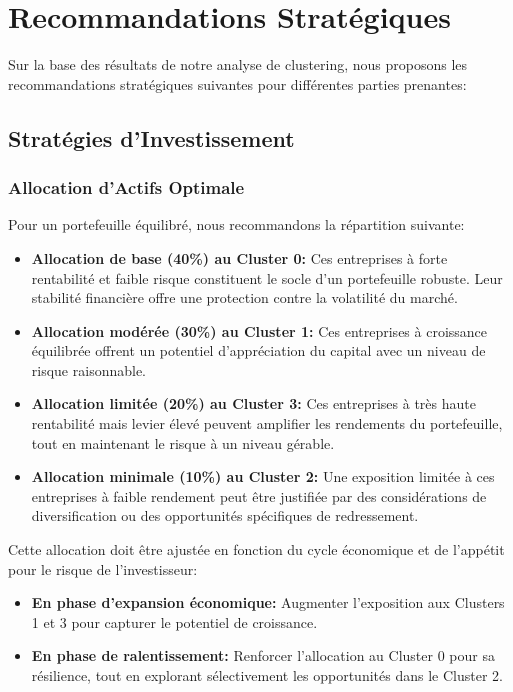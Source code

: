 \documentclass[12pt]{article}
\begin{document}
\newpage
\section{Recommandations Stratégiques}
Sur la base des résultats de notre analyse de clustering, nous proposons les recommandations stratégiques suivantes pour différentes parties prenantes:

\subsection{Stratégies d'Investissement}
\subsubsection{Allocation d'Actifs Optimale}
Pour un portefeuille équilibré, nous recommandons la répartition suivante:

\begin{itemize}
    \item \textbf{Allocation de base (40\%) au Cluster 0:} Ces entreprises à forte rentabilité et faible risque constituent le socle d'un portefeuille robuste. Leur stabilité financière offre une protection contre la volatilité du marché.
    
    \item \textbf{Allocation modérée (30\%) au Cluster 1:} Ces entreprises à croissance équilibrée offrent un potentiel d'appréciation du capital avec un niveau de risque raisonnable.
    
    \item \textbf{Allocation limitée (20\%) au Cluster 3:} Ces entreprises à très haute rentabilité mais levier élevé peuvent amplifier les rendements du portefeuille, tout en maintenant le risque à un niveau gérable.
    
    \item \textbf{Allocation minimale (10\%) au Cluster 2:} Une exposition limitée à ces entreprises à faible rendement peut être justifiée par des considérations de diversification ou des opportunités spécifiques de redressement.
\end{itemize}

Cette allocation doit être ajustée en fonction du cycle économique et de l'appétit pour le risque de l'investisseur:

\begin{itemize}
    \item \textbf{En phase d'expansion économique:} Augmenter l'exposition aux Clusters 1 et 3 pour capturer le potentiel de croissance.
    
    \item \textbf{En phase de ralentissement:} Renforcer l'allocation au Cluster 0 pour sa résilience, tout en explorant sélectivement les opportunités dans le Cluster 2.
\end{itemize}
\end{document}
